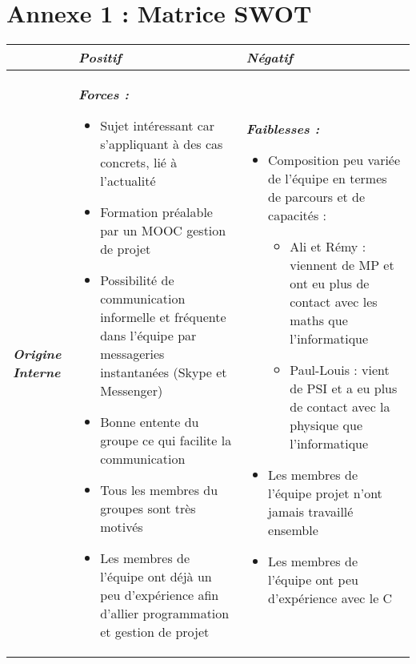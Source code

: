 \documentclass[light]{ceri}
\begin{document}
\renewcommand{\labelitemii}{$\star$}
\thispagestyle{empty}

\section*{Annexe 1 : Matrice SWOT}

\begin{table}[h]
    \centering
    \begin{tabular}{|p{1.5cm}|p{7cm}|p{7cm}|}
    \hline
          & \cellcolor{green!30} \centering \textit{\textbf {Positif}} & \cellcolor{red!40} \centering \textit{\textbf {Négatif}}
        \tabularnewline \hline
        \cellcolor{yellow!30}  \textit{\textbf {Origine Interne}} & \cellcolor{yellow!30}\centering \textit{\textbf {Forces : }} 
        \begin{itemize}
            \item Sujet intéressant car s’appliquant à des cas concrets, lié à l’actualité
            \item Formation préalable par un MOOC gestion de projet
            \item Possibilité de communication informelle et fréquente dans l’équipe par messageries
            instantanées (Skype et Messenger)
            \item Bonne entente du groupe ce qui facilite la communication
            \item Tous les membres du groupes sont très motivés
            \item Les membres de l'équipe ont déjà un peu d'expérience afin d'allier programmation et gestion de projet
        \end{itemize}
        & \cellcolor{orange!35} \centering \textit{\textbf {Faiblesses :}} 
        \begin{itemize}
            \item Composition peu variée de l’équipe en termes de parcours et de capacités :
                \begin{itemize}
                \item Ali et Rémy : viennent de MP et ont eu plus de contact avec les maths que l'informatique
                \item Paul-Louis : vient de PSI et a eu plus de contact avec la physique que l'informatique
                \end{itemize}
            \item Les membres de l’équipe projet n’ont jamais travaillé ensemble
            \item Les membres de l'équipe ont peu d'expérience avec le C

\end{itemize}
\end{tabular}
\end{table}
\end{document}
